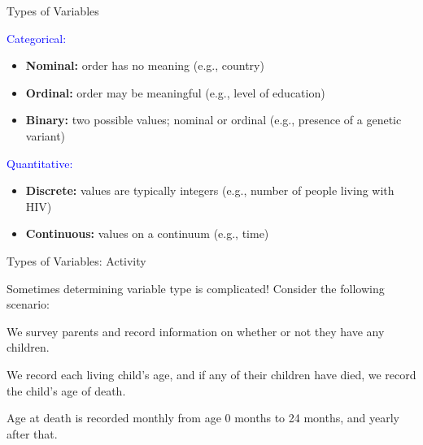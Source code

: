\documentclass[10pt,t]{beamer}
\begin{document}
\begin{frame}{Types of Variables}

\textcolor{blue}{Categorical:} 

\vspace{0.3cm}

\begin{itemize}
	\item \textbf{Nominal:} order has no meaning (e.g., country)
	\item \textbf{Ordinal:} order may be meaningful (e.g., level of education)
	\item \textbf{Binary:} two possible values; nominal or ordinal (e.g., presence of a genetic variant)
\end{itemize}

\vspace{0.3cm}

\textcolor{blue}{Quantitative:} 

\vspace{0.3cm}

\begin{itemize}
	\item \textbf{Discrete:} values are typically integers (e.g., number of people living with HIV)
	\item \textbf{Continuous:} values on a continuum (e.g., time)
\end{itemize}

\end{frame}

\begin{frame}{Types of Variables: Activity}

Sometimes determining variable type is complicated! Consider the following scenario:

\vspace{0.3cm}

We survey parents and record information on whether or not they have any children. 
\bigskip

We record each living child's age, and if any of their children have died, we record the child's age of death.
\bigskip

 Age at death is recorded monthly from age 0 months to 24 months, and yearly after that. 

\end{frame}
\end{document}

